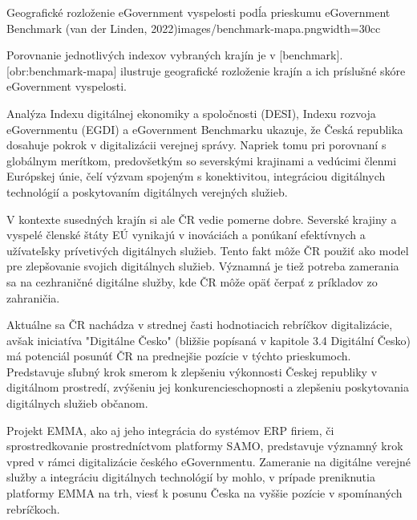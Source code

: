 {Geografické rozloženie eGovernment vyspelosti podĺa prieskumu eGovernment Benchmark (van der Linden, 2022)}{images/benchmark-mapa.png}{width=30cc}

Porovnanie jednotlivých indexov vybraných krajín je v [benchmark]. [obr:benchmark-mapa] ilustruje geografické rozloženie krajín a ich príslušné skóre eGovernment vyspelosti.


Analýza Indexu digitálnej ekonomiky a spoločnosti (DESI), Indexu rozvoja eGovernmentu (EGDI) a eGovernment Benchmarku ukazuje, že Česká republika dosahuje pokrok v digitalizácii verejnej správy. Napriek tomu pri porovnaní s globálnym merítkom, predovšetkým so severskými krajinami a vedúcimi členmi Európskej únie, čelí výzvam spojeným s konektivitou, integráciou digitálnych technológií a poskytovaním digitálnych verejných služieb.

V kontexte susedných krajín si ale ČR vedie pomerne dobre. Severské krajiny a vyspelé členské štáty EÚ vynikajú v inováciách a ponúkaní efektívnych a užívateľsky prívetivých digitálnych služieb. Tento fakt môže ČR použiť ako model pre zlepšovanie svojich digitálnych služieb. Významná je tiež potreba zamerania sa na cezhraničné digitálne služby, kde ČR môže opäť čerpať z príkladov zo zahraničia.

Aktuálne sa ČR nachádza v strednej časti hodnotiacich rebríčkov digitalizácie, avšak iniciatíva "Digitálne Česko" (bližšie popísaná v kapitole 3.4 Digitální Česko) má potenciál posunúť ČR na prednejšie pozície v týchto prieskumoch. Predstavuje sľubný krok smerom k zlepšeniu výkonnosti Českej republiky v digitálnom prostredí, zvýšeniu jej konkurencieschopnosti a zlepšeniu poskytovania digitálnych služieb občanom.

Projekt EMMA, ako aj jeho integrácia do systémov ERP firiem, či sprostredkovanie prostredníctvom platformy SAMO, predstavuje významný krok vpred v rámci digitalizácie českého eGovernmentu. Zameranie na digitálne verejné služby a integráciu digitálnych technológií by mohlo, v prípade preniknutia platformy EMMA na trh, viesť k posunu Česka na vyššie pozície v spomínaných rebríčkoch.


